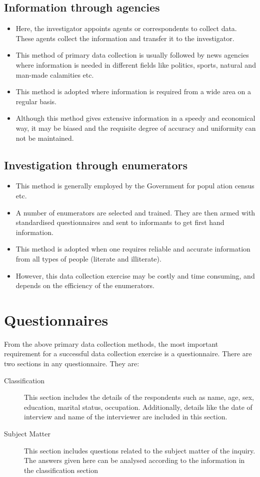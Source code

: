 \documentclass[
10pt, %
a4paper, %
]{report}
\begin{document}
\subsection{Information through agencies}
\begin{itemize}
\item  Here, the investigator appoints agents or correspondents to collect data. These agents collect the information and transfer it to the investigator.
\item This method of primary data collection is usually followed by
news agencies where information is needed in different fields like
politics, sports, natural and man-made calamities etc.
\item This method is adopted where information is required from a
wide area on a regular basis.
\item Although this method gives extensive information in a speedy and economical way, it may be biased and the requisite degree of accuracy and uniformity can not be maintained.
\end{itemize}
\subsection{Investigation through enumerators}
\begin{itemize}
\item This method is generally employed by the Government for popul
ation census etc.
\item A number of enumerators are selected and trained. They are then armed with standardised questionnaires and sent to informants to get first hand information.
\item This method is adopted when one requires reliable and accurate
information from all types of people (literate and illiterate).
\item However, this data collection exercise may be costly and time
consuming, and depends on the efficiency of the enumerators.
\end{itemize}

\section{Questionnaires}
From the above primary data collection methods, the most important
requirement for a successful data collection exercise is a questionnaire. There are two sections in any questionnaire. They are:
\begin{description}
\item[Classification] This section includes the details of the respondents such as name, age, sex, education, marital status, occupation. Additionally, details like the date of interview and name of the interviewer are included in this section.
\item[Subject Matter] This section includes questions related to the subject matter of the inquiry. The answers given here can be analysed according to the information in the classification section
\end{description}
\end{document}
